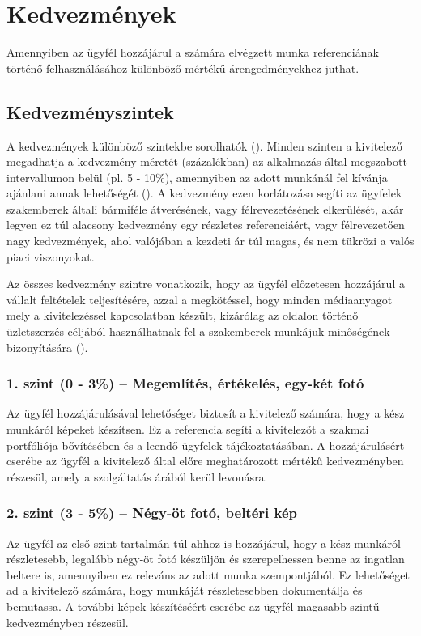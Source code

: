 \section{Kedvezmények}


\newcommand{\sorSzamKe}{\stepcounter{Kecounter}\theKecounter}

Amennyiben az ügyfél hozzájárul a számára elvégzett munka referenciának történő felhasználásához különböző mértékű árengedményekhez juthat.

\subsection{Kedvezményszintek}
A kedvezmények különböző szintekbe sorolhatók (\kovAzon{Ke\_\sorSzamKe}). Minden szinten a kivitelező megadhatja
a kedvezmény méretét (százalékban) az alkalmazás által megszabott intervallumon belül (pl. 5 - 10\%), amennyiben az adott munkánál fel kívánja ajánlani annak lehetőségét (\kovAzon{Ke\_\sorSzamKe}). 
A kedvezmény ezen korlátozása segíti az ügyfelek szakemberek általi bármiféle átverésének, vagy félrevezetésének elkerülését, akár legyen ez túl alacsony kedvezmény egy részletes referenciáért, vagy félrevezetően nagy kedvezmények, ahol valójában a kezdeti ár túl magas, és nem tükrözi a valós piaci viszonyokat.

Az összes kedvezmény szintre vonatkozik, hogy az ügyfél előzetesen hozzájárul a vállalt feltételek teljesítésére, azzal a megkötéssel, hogy minden médiaanyagot mely a kivitelezéssel kapcsolatban készült, kizárólag az oldalon történő üzletszerzés céljából használhatnak fel a szakemberek munkájuk minőségének bizonyítására (\kovAzon{Ke\_\sorSzamKe}).

\subsubsection{1. szint (0 - 3\%) – Megemlítés, értékelés, egy-két fotó} 
Az ügyfél hozzájárulásával lehetőséget biztosít a kivitelező számára, hogy a kész munkáról képeket készítsen. Ez a referencia segíti a kivitelezőt a szakmai portfóliója bővítésében és a leendő ügyfelek tájékoztatásában. A hozzájárulásért cserébe az ügyfél a kivitelező által előre meghatározott mértékű kedvezményben részesül, amely a szolgáltatás árából kerül levonásra.

\subsubsection{2. szint (3 - 5\%) – Négy-öt fotó, beltéri kép} 
Az ügyfél az első szint tartalmán túl ahhoz is hozzájárul, hogy a kész munkáról részletesebb, legalább négy-öt fotó készüljön és szerepelhessen benne az ingatlan beltere is, amennyiben ez releváns az adott munka szempontjából. Ez lehetőséget ad a kivitelező számára, hogy munkáját részletesebben dokumentálja és bemutassa. A további képek készítéséért cserébe az ügyfél magasabb szintű kedvezményben részesül.

